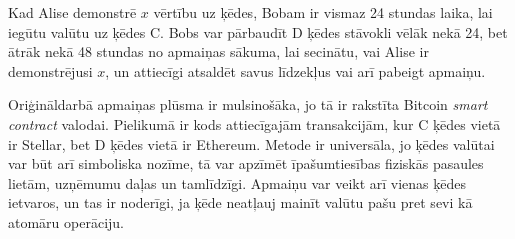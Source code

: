 Kad Alise demonstrē $x$ vērtību uz ķēdes, Bobam ir vismaz 24 stundas laika, lai iegūtu valūtu uz ķēdes C.
Bobs var pārbaudīt D ķēdes stāvokli vēlāk nekā 24, bet ātrāk nekā 48 stundas no apmaiņas sākuma, lai secinātu, vai Alise ir demonstrējusi $x$, un attiecīgi atsaldēt savus līdzekļus vai arī pabeigt apmaiņu.

Oriģināldarbā apmaiņas plūsma ir mulsinošāka, jo tā ir rakstīta Bitcoin \textit{smart contract} valodai. Pielikumā ir kods attiecīgajām transakcijām, kur C ķēdes vietā ir Stellar, bet D ķēdes vietā ir Ethereum.
Metode ir universāla, jo ķēdes valūtai var būt arī simboliska nozīme, tā var apzīmēt īpašumtiesības fiziskās pasaules lietām, uzņēmumu daļas un tamlīdzīgi.\cite{rosenfeld12}
Apmaiņu var veikt arī vienas ķēdes ietvaros, un tas ir noderīgi, ja ķēde neatļauj mainīt valūtu pašu pret sevi kā atomāru operāciju.
